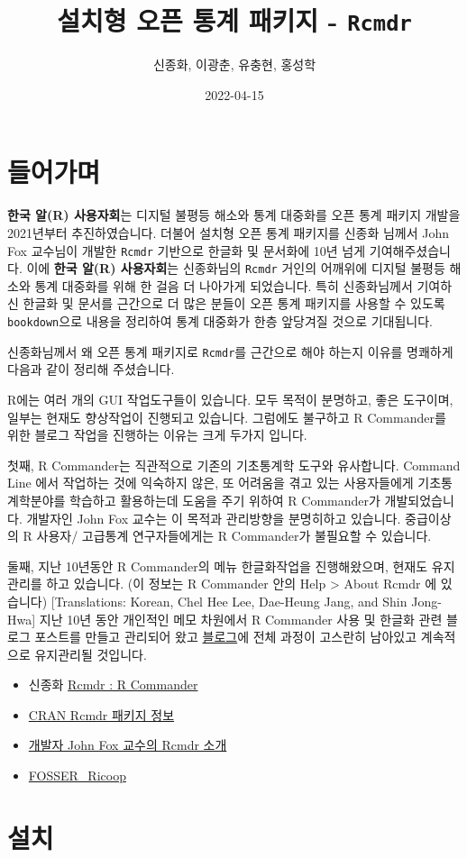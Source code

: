 \documentclass[
]{book}
\title{설치형 오픈 통계 패키지 - \texttt{Rcmdr}}
\author{신종화, 이광춘, 유충현, 홍성학}
\date{2022-04-15}
\providecommand{\tightlist}{%
  \setlength{\itemsep}{0pt}\setlength{\parskip}{0pt}}
\begin{document}
\maketitle

{
\setcounter{tocdepth}{1}
\tableofcontents
}
\hypertarget{uxb4e4uxc5b4uxac00uxba70}{%
\chapter{들어가며}\label{uxb4e4uxc5b4uxac00uxba70}}

\textbf{한국 알(R) 사용자회}는 디지털 불평등 해소와 통계 대중화를 오픈 통계 패키지 개발을 2021년부터 추진하였습니다.
더불어 설치형 오픈 통계 패키지를 신종화 님께서 John Fox 교수님이 개발한 \texttt{Rcmdr} 기반으로 한글화 및 문서화에 10년 넘게 기여해주셨습니다. 이에 \textbf{한국 알(R) 사용자회}는 신종화님의 \texttt{Rcmdr} 거인의 어깨위에 디지털 불평등 해소와 통계 대중화를 위해 한 걸음 더 나아가게 되었습니다. 특히 신종화님께서 기여하신 한글화 및 문서를 근간으로 더 많은 분들이 오픈 통계 패키지를 사용할 수 있도록 \texttt{bookdown}으로 내용을 정리하여 통계 대중화가 한층 앞당겨질 것으로 기대됩니다.

신종화님께서 왜 오픈 통계 패키지로 \texttt{Rcmdr}를 근간으로 해야 하는지 이유를 명쾌하게 다음과 같이 정리해 주셨습니다.

R에는 여러 개의 GUI 작업도구들이 있습니다. 모두 목적이 분명하고, 좋은 도구이며, 일부는 현재도 향상작업이 진행되고 있습니다. 그럼에도 불구하고 R Commander를 위한 블로그 작업을 진행하는 이유는 크게 두가지 입니다.

첫째, R Commander는 직관적으로 기존의 기초통계학 도구와 유사합니다. Command Line 에서 작업하는 것에 익숙하지 않은, 또 어려움을 겪고 있는 사용자들에게 기초통계학분야를 학습하고 활용하는데 도움을 주기 위하여 R Commander가 개발되었습니다. 개발자인 John Fox 교수는 이 목적과 관리방향을 분명히하고 있습니다. 중급이상의 R 사용자/ 고급통계 연구자들에게는 R Commander가 불필요할 수 있습니다.

둘째, 지난 10년동안 R Commander의 메뉴 한글화작업을 진행해왔으며, 현재도 유지관리를 하고 있습니다. (이 정보는 R Commander 안의 Help \textgreater{} About Rcmdr 에 있습니다) {[}Translations: Korean, Chel Hee Lee, Dae-Heung Jang, and Shin Jong-Hwa{]} 지난 10년 동안 개인적인 메모 차원에서 R Commander 사용 및 한글화 관련 블로그 포스트를 만들고 관리되어 왔고 \href{http://modernity.tistory.com}{블로그}에 전체 과정이 고스란히 남아있고 계속적으로 유지관리될 것입니다.

\begin{itemize}
\tightlist
\item
  신종화 \href{https://rcmdr.kr/}{Rcmdr : R Commander}
\item
  \href{https://cran.r-project.org/web/packages/Rcmdr/index.html}{CRAN Rcmdr 패키지 정보}
\item
  \href{https://socialsciences.mcmaster.ca/jfox/Misc/Rcmdr/}{개발자 John Fox 교수의 Rcmdr 소개}
\item
  \href{https://modernity.tistory.com/}{FOSSER\_Ricoop}
\end{itemize}

\hypertarget{install}{%
\chapter{설치}\label{install}}

  
\end{document}
